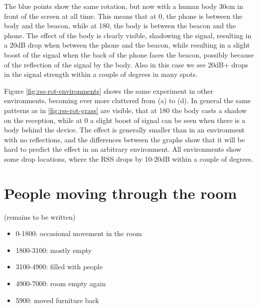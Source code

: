 The blue points show the same rotation, but now with a human body 30cm in front of the screen at all time.
This means that at 0\textdegree{}, the phone is between the body and the beacon, while at 180\textdegree{}, the body is between the beacon and the phone.
The effect of the body is clearly visible, shadowing the signal, resulting in a 20dB drop when between the phone and the beacon, while resulting in a slight boost of the signal when the back of the phone faces the beacon, possibly because of the reflection of the signal by the body.
Also in this case we see 20dB+ drops in the signal strength within a couple of degrees in many spots.


Figure \ref{fig:rss-rot-environments} shows the same experiment in other environments, becoming ever more cluttered from (a) to (d).
In general the same patterns as in \ref{fig:rss-rot-grass} are visible, that at 180\textdegree{} the body casts a shadow on the reception, while at 0\textdegree{} a slight boost of signal can be seen when there is a body behind the device.
The effect is generally smaller than in an environment with no reflections, and the differences between the graphs show that it will be hard to predict the effect in an arbitrary environment.
All environments show some drop locations, where the RSS drops by 10-20dB within a couple of degrees.

\section{People moving through the room}
(remains to be written)
\begin{itemize}
    \item 0-1800: occasional movement in the room 
    \item 1800-3100: mostly empty
    \item 3100-4900: filled with people
    \item 4900-7000: room empty again
    \item 5900: moved furniture back
\end{itemize}
